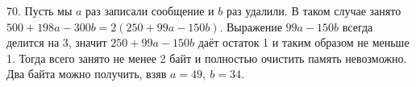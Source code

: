 70. Пусть мы $a$ раз записали сообщение и $b$ раз удалили. В таком случае занято $500+198a-300b=2(250+99a-150b).$ Выражение $99a-150b$ всегда делится на 3, значит
$250+99a-150b$ даёт остаток 1 и таким образом не меньше 1. Тогда всего занято не менее 2 байт и полностью очистить память невозможно. Два байта можно получить, взяв $a=49,\ b=34.$\\
